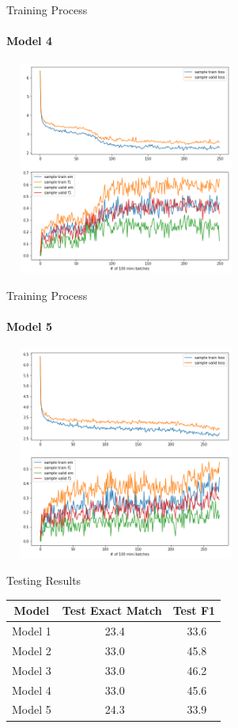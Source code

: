 \documentclass{beamer}
\begin{document}
\begin{frame}{Training Process}\framesubtitle{Model 4}
    \begin{center}
        \includegraphics[width=8cm, height=7cm]{figures/match_change2.png}
    \end{center}

\end{frame}

\begin{frame}{Training Process}\framesubtitle{Model 5}
    \begin{center}
        \includegraphics[width=8cm, height=7cm]{figures/match_change3.png}
    \end{center}

\end{frame}

\begin{frame}{Testing Results}
    \begin{table}[htbp]\centering
      \begin{tabular}{|c|c|c|}
        \hline
        Model& Test Exact Match & Test F1 \\
        \hline\hline
        Model 1 & \ 23.4 &\ 33.6 \\
        Model 2 & \ 33.0 &\ 45.8 \\
        Model 3 & \ 33.0 &\ 46.2 \\
        Model 4 & \ 33.0 &\ 45.6 \\
        Model 5 & \ 24.3 &\ 33.9 \\
        \hline
      \end{tabular}
    \end{table}
\end{frame}
\end{document}
